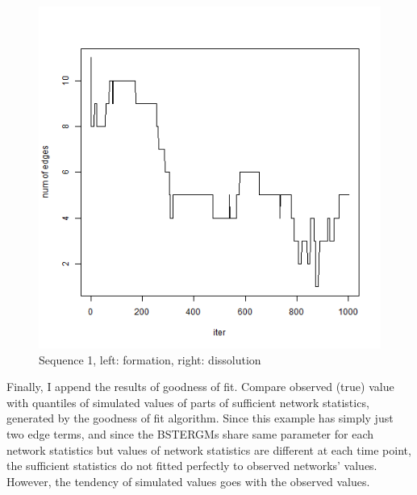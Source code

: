 \documentclass[aspectratio=169,ignorenonframetext,9pt]{beamer}
\theoremstyle{plain}
\theoremstyle{definition}
\begin{document}
\begin{figure}[h]
\begin{center}
        \includegraphics[scale=0.23]{pictures/net3seq_chain1_lastsampler_num_edges.png}
    \caption{Sequence 1, left: formation, right: dissolution}
    \end{center}
\end{figure}
\clearpage


Finally, I append the results of goodness of fit.
Compare observed (true) value with quantiles of simulated values of parts of sufficient network statistics,
generated by the goodness of fit algorithm.
Since this example has simply just two edge terms, and since the BSTERGMs share same parameter
for each network statistics but values of network statistics are different at each time point,
the sufficient statistics do not fitted perfectly to observed networks' values.
However, the tendency of simulated values goes with the observed values.
\end{document}
